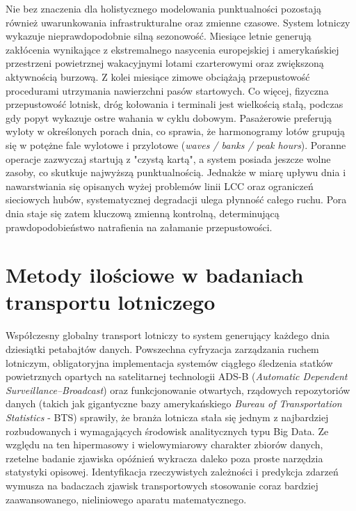 Nie bez znaczenia dla holistycznego modelowania punktualności pozostają również uwarunkowania infrastrukturalne oraz zmienne czasowe. System lotniczy wykazuje nieprawdopodobnie silną sezonowość. Miesiące letnie generują zakłócenia wynikające z ekstremalnego nasycenia europejskiej i amerykańskiej przestrzeni powietrznej wakacyjnymi lotami czarterowymi oraz zwiększoną aktywnością burzową. Z kolei miesiące zimowe obciążają przepustowość procedurami utrzymania nawierzchni pasów startowych. Co więcej, fizyczna przepustowość lotnisk, dróg kołowania i terminali jest wielkością stałą, podczas gdy popyt wykazuje ostre wahania w cyklu dobowym. Pasażerowie preferują wyloty w określonych porach dnia, co sprawia, że harmonogramy lotów grupują się w potężne fale wylotowe i przylotowe (\textit{waves / banks / peak hours}). Poranne operacje zazwyczaj startują z "czystą kartą", a system posiada jeszcze wolne zasoby, co skutkuje najwyższą punktualnością. Jednakże w miarę upływu dnia i nawarstwiania się opisanych wyżej problemów linii LCC oraz ograniczeń sieciowych hubów, systematycznej degradacji ulega płynność całego ruchu. Pora dnia staje się zatem kluczową zmienną kontrolną, determinującą prawdopodobieństwo natrafienia na załamanie przepustowości. 

\section{Metody ilościowe w badaniach transportu lotniczego}

Współczesny globalny transport lotniczy to system generujący każdego dnia dziesiątki petabajtów danych. Powszechna cyfryzacja zarządzania ruchem lotniczym, obligatoryjna implementacja systemów ciągłego śledzenia statków powietrznych opartych na satelitarnej technologii ADS-B (\textit{Automatic Dependent Surveillance–Broadcast}) oraz funkcjonowanie otwartych, rządowych repozytoriów danych (takich jak gigantyczne bazy amerykańskiego \textit{Bureau of Transportation Statistics} - BTS) sprawiły, że branża lotnicza stała się jednym z najbardziej rozbudowanych i wymagających środowisk analitycznych typu Big Data. Ze względu na ten hipermasowy i wielowymiarowy charakter zbiorów danych, rzetelne badanie zjawiska opóźnień wykracza daleko poza proste narzędzia statystyki opisowej. Identyfikacja rzeczywistych zależności i predykcja zdarzeń wymusza na badaczach zjawisk transportowych stosowanie coraz bardziej zaawansowanego, nieliniowego aparatu matematycznego.

